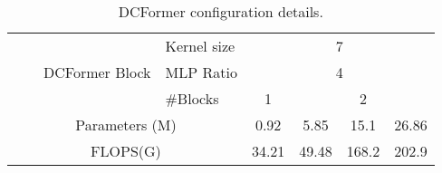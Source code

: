 \begin{table*}[t]
\begin{center}
\begin{tabular}{|llll|cccc|}
\multicolumn{1}{|l|}{}                       & \multicolumn{1}{l|}{}                                    & \multicolumn{1}{l|}{\multirow{3}{*}{DCFormer Block}} & Kernel size                & \multicolumn{4}{c|}{7}                                                                       \\ \cline{4-8} 
\multicolumn{1}{|l|}{}                       & \multicolumn{1}{l|}{}                                    & \multicolumn{1}{l|}{}                                    & MLP Ratio                  & \multicolumn{4}{c|}{4}                                                                       \\ \cline{4-8} 
\multicolumn{1}{|l|}{}                       & \multicolumn{1}{l|}{}                                    & \multicolumn{1}{l|}{}                                    & \#Blocks                    & \multicolumn{1}{c|}{1}     & \multicolumn{3}{c|}{2}                                          \\ \hline
\multicolumn{4}{|c|}{Parameters (M)}                                                                                                                                                            & \multicolumn{1}{c|}{0.92} & \multicolumn{1}{c|}{5.85} & \multicolumn{1}{c|}{15.1} & 26.86 \\ \hline
\multicolumn{4}{|c|}{FLOPS(G)}                                                                                                                                                                  & \multicolumn{1}{c|}{34.21} & \multicolumn{1}{c|}{49.48} & \multicolumn{1}{c|}{168.2} & 202.9 \\ \hline
\end{tabular}
\end{center}
\caption{\label{config} DCFormer configuration details.}
\end{table*}